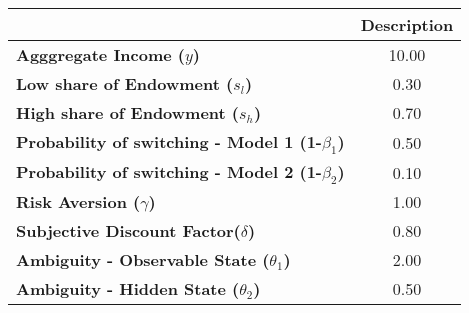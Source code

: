 \begin{tiny}\begin{tabular}{|l|c|}
\hline
&\textbf{Description}\\\hline
\textbf{Agggregate Income ($y$)}&10.00\\\hline
\textbf{Low share of Endowment ($s_l$)}&0.30\\\hline
\textbf{High share of Endowment ($s_h$)}&0.70\\\hline
\textbf{Probability of switching - Model 1 (1-$\beta_1$)}&0.50\\\hline
\textbf{Probability of switching - Model 2 (1-$\beta_2$)}&0.10\\\hline
\textbf{Risk Aversion ($\gamma$)}&1.00\\\hline
\textbf{Subjective Discount Factor($\delta$)}&0.80\\\hline
\textbf{Ambiguity - Observable State ($\theta_1$)}&2.00\\\hline
\textbf{Ambiguity - Hidden State ($\theta_2$)}&0.50\\\hline
\end{tabular}
\end{tiny}